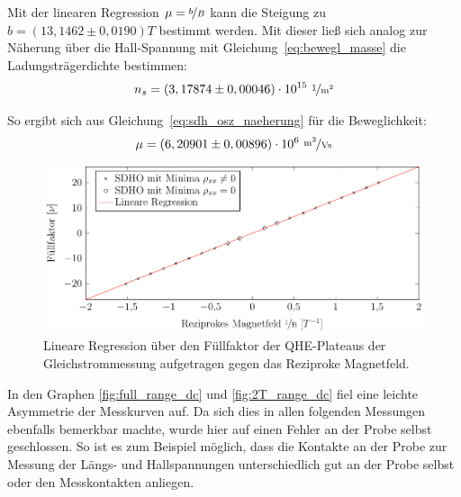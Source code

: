 Mit der linearen Regression $\mu = \nicefrac{b}{B}$ kann die Steigung zu $b=(13,1462 \pm 0,0190)\unit{T}$ bestimmt werden. Mit dieser ließ sich analog zur Näherung über die Hall-Spannung mit Gleichung~\eqref{eq:bewegl_masse} die Ladungsträgerdichte bestimmen:
\begin{equation}
n_s=  ( 3,17874 \pm 0,00046) \cdot 10^{15} ~ \unitfrac{1}{m^2}\\ %
\end{equation}

So ergibt sich aus Gleichung~\eqref{eq:sdh_osz_naeherung} für die Beweglichkeit:
\begin{equation}
\mu= (6,20901\pm 0,00896)\cdot 10^6 ~ \unitfrac{m^2}{Vs} %
\end{equation}
 

\begin{figure}[h]
	\centering
	\includegraphics{graphs/dc/auswertung.pdf}
	\caption[Lineare Regression Gleichstrommessung]{
		Lineare Regression über den Füllfaktor der QHE-Plateaus der Gleichstrommessung aufgetragen gegen das Reziproke Magnetfeld.
	}
	\label{fig:dc_sdho_ausw}
\end{figure}

In den Graphen \ref{fig:full_range_dc} und \ref{fig:2T_range_dc} fiel eine leichte Asymmetrie der Messkurven auf. Da sich dies in allen folgenden Messungen ebenfalls bemerkbar machte, wurde hier auf einen Fehler an der Probe selbst geschlossen. So ist es zum Beispiel möglich, dass die Kontakte an der Probe zur Messung der Längs- und Hallspannungen unterschiedlich gut an der Probe selbst oder den Messkontakten anliegen. 